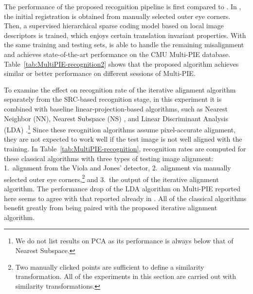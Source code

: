 The performance of the proposed recognition pipeline is first compared to
\cite{Yang2010-CVPR}. In \cite{Yang2010-CVPR}, the initial registration is
obtained from manually selected outer eye corners. Then, a supervised
hierarchical sparse coding model based on local image descriptors is trained,
which enjoys certain translation invariant properties. With the same training
and testing sets, \cite{Yang2010-CVPR} is able to handle the remaining
misalignment and achieves state-of-the-art performance on the CMU Multi-PIE
database.  Table~\ref{tab:MultiPIE-recognition2} shows that the proposed
algorithm achieves similar or better performance on different sessions of
Multi-PIE.

To examine the effect on recognition rate of the iterative alignment algorithm
separately from the SRC-based recognition stage, in this experiment it is
combined with baseline linear-projection-based algorithms, such as Nearest
Neighbor (NN), Nearest Subspace (NS) \cite{Lee2005-PAMI}, and Linear
Discriminant Analysis (LDA) \cite{Belhumeur1997-PAMI}.\footnote{We do not list
results on PCA \cite{Turk1991-CVPR} as its performance is always below that of
Nearest Subspace.} Since these recognition algorithms assume pixel-accurate
alignment, they are not expected to work well if the test image is not well
aligned with the training. In Table~\ref{tab:MultiPIE-recognition}, recognition
rates are computed for these classical algorithms with three types of testing
image alignment: 1.\ alignment from the Viola and Jones' detector, 2.\
alignment via manually selected outer eye corners,\footnote{Two manually
clicked points are sufficient to define a similarity transformation. All of the
experiments in this section are carried out with similarity transformations.}
and 3.\ the output of the iterative alignment algorithm. The performance drop
of the LDA algorithm on Multi-PIE reported here seems to agree with that
reported already in \cite{gross2010multi}.  All of the classical algorithms
benefit greatly from being paired with the proposed iterative alignment
algorithm.

